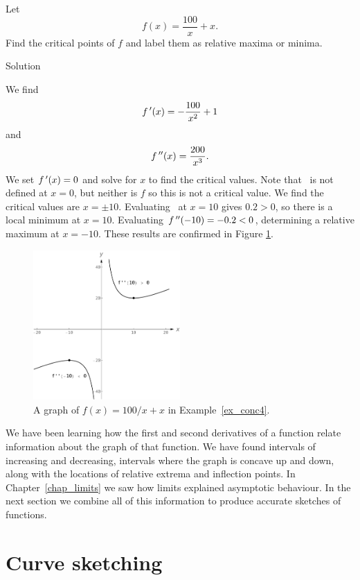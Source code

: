 \begin{example}\label{ex_conc4}
Let 
$$f(x)=\dfrac{100}{x} + x.$$
Find the critical points of $f$ and label them as relative maxima or minima.

Solution 

We find 
$$f\,'(x)=-\dfrac{100}{x^2}+1$$
and 
$$f\,''(x) = \dfrac{200}{x^3}.$$  We set $f\,'(x)=0$ and solve for $x$ to find the critical values. Note that \fp\ is not defined at $x=0$, but neither is $f$ so this is not a critical value. We find  the critical values are $x=\pm 10$.  Evaluating \fpp\ at $x=10$ gives $0.2>0$, so there is a local minimum at $x=10$.  Evaluating $f\,''(-10)=-0.2<0$, determining a relative maximum at  $x=-10$. These results are confirmed in Figure \ref{fig_behaviour_23}.

\begin{figure}[H]
	\begin{center}
			\includegraphics[width=0.5\textwidth]{fig_behaviour_23}
	\caption{A graph of $f(x)=100/x + x$ in Example~\ref{ex_conc4}.}
	\label{fig_behaviour_23}
	\end{center}
\end{figure}

\end{example}

We have been learning how the first and second derivatives of a function relate information about the graph of that function. We have found intervals of increasing and decreasing, intervals where the graph is concave up and down, along with the locations of relative extrema and inflection points. In Chapter~\ref{chap_limits} we saw how limits explained asymptotic behaviour. In the next section we combine all of this information to produce accurate sketches of functions.



\section{Curve sketching}\label{sec:sketch}


